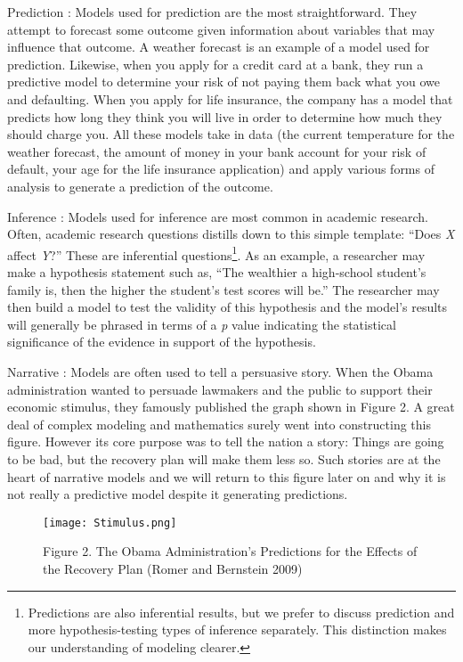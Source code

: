 \documentclass[]{memoir}
\let\Oldincludegraphics\includegraphics
\renewcommand{\includegraphics}[1]{\Oldincludegraphics[max size={\textwidth}{\textheight}]{#1}}
\begin{document}
Prediction : Models used for prediction are the most straightforward.
They attempt to forecast some outcome given information about variables
that may influence that outcome. A weather forecast is an example of a
model used for prediction. Likewise, when you apply for a credit card at
a bank, they run a predictive model to determine your risk of not paying
them back what you owe and defaulting. When you apply for life
insurance, the company has a model that predicts how long they think you
will live in order to determine how much they should charge you. All
these models take in data (the current temperature for the weather
forecast, the amount of money in your bank account for your risk of
default, your age for the life insurance application) and apply various
forms of analysis to generate a prediction of the outcome.

Inference : Models used for inference are most common in academic
research. Often, academic research questions distills down to this
simple template: ``Does \emph{X} affect \emph{Y}?'' These are
inferential questions\footnote{Predictions are also inferential results,
  but we prefer to discuss prediction and more hypothesis-testing types
  of inference separately. This distinction makes our understanding of
  modeling clearer.}. As an example, a researcher may make a hypothesis
statement such as, ``The wealthier a high-school student's family is,
then the higher the student's test scores will be.'' The researcher may
then build a model to test the validity of this hypothesis and the
model's results will generally be phrased in terms of a \emph{p} value
indicating the statistical significance of the evidence in support of
the hypothesis.

Narrative : Models are often used to tell a persuasive story. When the
Obama administration wanted to persuade lawmakers and the public to
support their economic stimulus, they famously published the graph shown
in Figure 2. A great deal of complex modeling and mathematics surely
went into constructing this figure. However its core purpose was to tell
the nation a story: Things are going to be bad, but the recovery plan
will make them less so. Such stories are at the heart of narrative
models and we will return to this figure later on and why it is not
really a predictive model despite it generating predictions.

\begin{figure}[htbp]
\centering
\texttt{[image: Stimulus.png]}
\caption{Figure 2. The Obama Administration's Predictions for the
Effects of the Recovery Plan (Romer and Bernstein 2009)}
\end{figure}
\end{document}
